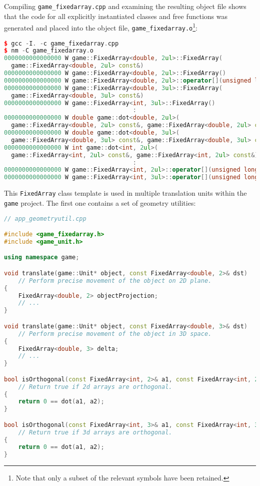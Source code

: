 \noindent Compiling \lstinline!game_fixedarray.cpp! and examining the resulting
object file shows that the code for all explicitly instantiated classes
and free functions was generated and placed into the object file,
\lstinline!game_fixedarray.o!{\cprotect\footnote{Note that only a subset
  of the relevant symbols have been retained.}}:

\begin{lstlisting}[language=C++]
$ gcc -I. -c game_fixedarray.cpp
$ nm -C game_fixedarray.o
0000000000000000 W game::FixedArray<double, 2ul>::FixedArray(
  game::FixedArray<double, 2ul> const&)
0000000000000000 W game::FixedArray<double, 2ul>::FixedArray()
0000000000000000 W game::FixedArray<double, 2ul>::operator[](unsigned long)
0000000000000000 W game::FixedArray<double, 3ul>::FixedArray(
  game::FixedArray<double, 3ul> const&)
0000000000000000 W game::FixedArray<int, 3ul>::FixedArray()
                                    :
0000000000000000 W double game::dot<double, 2ul>(
  game::FixedArray<double, 2ul> const&, game::FixedArray<double, 2ul> const&)
0000000000000000 W double game::dot<double, 3ul>(
  game::FixedArray<double, 3ul> const&, game::FixedArray<double, 3ul> const&)
0000000000000000 W int game::dot<int, 2ul>(
  game::FixedArray<int, 2ul> const&, game::FixedArray<int, 2ul> const&)
                                    :
0000000000000000 W game::FixedArray<int, 2ul>::operator[](unsigned long) const
0000000000000000 W game::FixedArray<int, 3ul>::operator[](unsigned long) const
\end{lstlisting}
    
\noindent This \lstinline!FixedArray! class template is used in multiple translation
units within the \lstinline!game! project. The first one contains a set
of geometry utilities:

\begin{lstlisting}[language=C++]
// app_geometryutil.cpp

#include <game_fixedarray.h>
#include <game_unit.h>

using namespace game;

void translate(game::Unit* object, const FixedArray<double, 2>& dst)
    // Perform precise movement of the object on 2D plane.
{
    FixedArray<double, 2> objectProjection;
    // ...
}

void translate(game::Unit* object, const FixedArray<double, 3>& dst)
    // Perform precise movement of the object in 3D space.
{
    FixedArray<double, 3> delta;
    // ...
}

bool isOrthogonal(const FixedArray<int, 2>& a1, const FixedArray<int, 2>& a2)
    // Return true if 2d arrays are orthogonal.
{
    return 0 == dot(a1, a2);
}

bool isOrthogonal(const FixedArray<int, 3>& a1, const FixedArray<int, 3>& a2)
    // Return true if 3d arrays are orthogonal.
{
    return 0 == dot(a1, a2);
}
\end{lstlisting}
    

